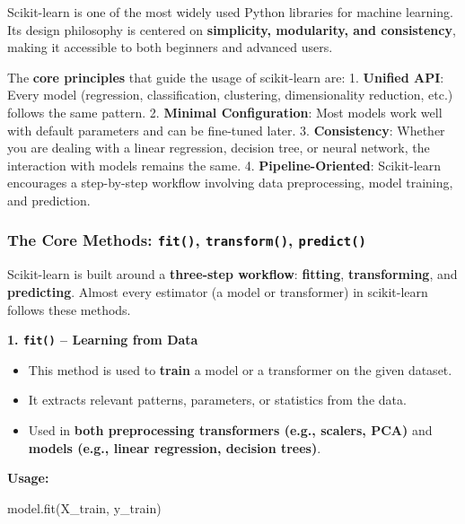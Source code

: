 \documentclass{article}
\providecommand{\tightlist}{%
      \setlength{\itemsep}{0pt}\setlength{\parskip}{0pt}}
\newenvironment{Shaded}{}{}
\newcommand{\NormalTok}[1]{{#1}}
\begin{document}
Scikit-learn is one of the most widely used Python libraries for machine
learning. Its design philosophy is centered on \textbf{simplicity,
modularity, and consistency}, making it accessible to both beginners and
advanced users.

The \textbf{core principles} that guide the usage of scikit-learn are:
1. \textbf{Unified API}: Every model (regression, classification,
clustering, dimensionality reduction, etc.) follows the same pattern. 2.
\textbf{Minimal Configuration}: Most models work well with default
parameters and can be fine-tuned later. 3. \textbf{Consistency}: Whether
you are dealing with a linear regression, decision tree, or neural
network, the interaction with models remains the same. 4.
\textbf{Pipeline-Oriented}: Scikit-learn encourages a step-by-step
workflow involving data preprocessing, model training, and prediction.

\subsubsection{\texorpdfstring{The Core Methods: \texttt{fit()},
\texttt{transform()},
\texttt{predict()}}{The Core Methods: fit(), transform(), predict()}}\label{the-core-methods-fit-transform-predict}

Scikit-learn is built around a \textbf{three-step workflow}:
\textbf{fitting}, \textbf{transforming}, and \textbf{predicting}. Almost
every estimator (a model or transformer) in scikit-learn follows these
methods.

\textbf{1. \texttt{fit()} -- Learning from Data}

\begin{itemize}
\tightlist
\item
  This method is used to \textbf{train} a model or a transformer on the
  given dataset.
\item
  It extracts relevant patterns, parameters, or statistics from the
  data.
\item
  Used in \textbf{both preprocessing transformers (e.g., scalers, PCA)}
  and \textbf{models (e.g., linear regression, decision trees)}.
\end{itemize}

\textbf{Usage:}

\begin{Shaded}
\begin{Highlighting}[]
\NormalTok{model.fit(X\_train, y\_train)}
\end{Highlighting}
\end{Shaded}
\end{document}
